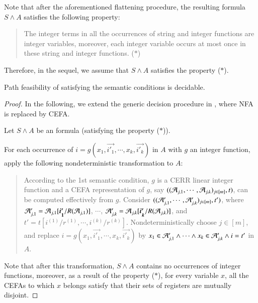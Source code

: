Note that after the aforementioned flattening procedure, the resulting formula $S \wedge A$ satisfies the following property: 
\begin{quote}
The integer terms in all the occurrences of string and integer functions  are integer variables, moreover, each integer variable occurs at most once in these string and integer functions.  \hfill ($*$)
\end{quote}
Therefore, in the sequel, we assume that $S \wedge A$ satisfies the property ($*$).

\begin{theorem}\label{thm-sl-int-dec}
Path feasibility of {\slint} satisfying the semantic conditions is decidable.
\end{theorem}

\begin{proof}
In the following, we extend the generic decision procedure in \cite{CHL+18}, where NFA is replaced by CEFA.

Let $S \wedge A$ be an {\slint} formula (satisfying the property ($*$)).

For each occurrence of $i = g(x_1, \vec{i'_1}, \cdots, x_k, \vec{i'_k})$ in $A$ with $g$ an integer function, apply the following nondeterministic transformation to $A$: 
\begin{quote}
According to the 1st semantic condition, $g$ is a CERR linear integer function and a CEFA representation of $g$, say $((\mathcal{A}_{j,1}, \cdots, \mathcal{A}_{j, k})_{j \in [m]}, t)$, can be computed effectively from $g$. Consider $((\mathcal{A}'_{j,1}, \cdots, \mathcal{A}'_{j, k})_{j \in [m]}, t')$, where $\NFA'_{j,1}=\NFA_{j,1}[\vec{i'_1}/R(\NFA_{j,1})]$, $\cdots$, $\NFA'_{j,k}=\NFA_{j,k}[\vec{i'_k}/R(\NFA_{j,k})]$, and $t' = t[i^{(1)}/r^{(1)}, \cdots, i^{(k)}/r^{(k)}]$.
Nondeterministically choose $j \in [m]$, and replace $i = g(x_1, \vec{i'_1}, \cdots, x_k, \vec{i'_k})$ by $x_1 \in \mathcal{A}'_{j,1} \wedge \cdots \wedge x_k \in \mathcal{A}'_{j,k} \wedge i = t'$ in $A$.
\end{quote}
Note that after this transformation, $S \wedge A$ contains no occurrences of integer functions, moreover, as a result of the property ($*$), for every variable $x$, all the CEFAs to which $x$ belongs satisfy that their sets of registers are  mutually disjoint.


\end{proof}

